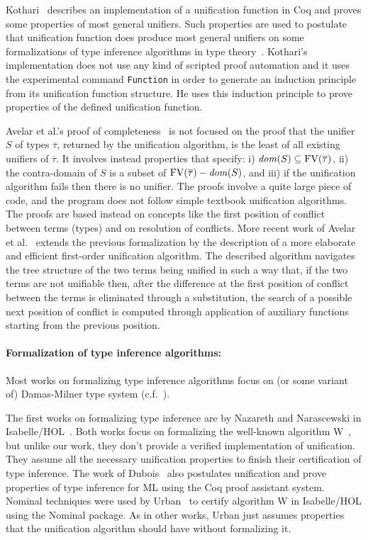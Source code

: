 Kothari~ describes an implementation of a unification
function in Coq and proves some properties of most general
unifiers. Such properties are used to postulate that unification
function does produce most general unifiers on some formalizations of
type inference algorithms in type
theory~. Kothari's implementation does not use
any kind of scripted proof automation and it uses the experimental
command \texttt{Function} in order to generate an induction principle
from its unification function structure. He uses this induction
principle to prove properties of the defined unification function.

Avelar et al.'s proof of completeness~ is not
focused on the proof that the unifier $S$ of types $\overline{\tau}$,
returned by the unification algorithm, is the least of all existing
unifiers of $\overline{\tau}$.  It involves instead properties that
specify: i) $\text{\it dom\/}(S) \subseteq \text{FV}(\overline{\tau})$, ii) the
contra-domain of $S$ is a subset of $\text{FV}(\overline{\tau}) - \text{\it dom\/}(S)$,
and iii) if the unification algorithm fails then there is no
unifier. The proofs involve a quite large piece of code, and the
program does not follow simple textbook unification algorithms. The
proofs are based instead on concepts like the first position of
conflict between terms (types) and on resolution of conflicts. More
recent work of Avelar et al.~\cite{AvelarGMA14} extends the previous
formalization by the description of a more elaborate and efficient
first-order unification algorithm. The described algorithm navigates
the tree structure of the two terms being unified in such a way that,
if the two terms are not unifiable then, after the difference at the
first position of conflict between the terms is eliminated through a
substitution, the search of a possible next position of conflict is
computed through application of auxiliary functions starting from the
previous position.

\paragraph{Formalization of type inference algorithms:} Most works on formalizing
type inference algorithms focus on (or some variant of) Damas-Milner type system
(c.f.~\cite{DuboisM99,NaraschewskiN-JAR,Nazareth-Nipkow,UrbanN2009,Garrigue10,Garrigue15}).

The first works on formalizing type inference are by Nazareth and
Narascewski in Isabelle/HOL~\cite{NaraschewskiN-JAR,Nazareth-Nipkow}.
Both works focus on formalizing the well-known algorithm
W~\cite{Milner78}, but unlike our work, they don't provide a verified
implementation of unification. They assume all the necessary
unification properties to finish their certification of type
inference. The work of Dubois~\cite{DuboisM99} also postulates
unification and prove properties of type inference for ML using the
Coq proof assistant system.  Nominal techniques were used by
Urban~\cite{UrbanN2009} to certify algorithm W in Isabelle/HOL using
the Nominal package. As in other works, Urban just assumes properties
that the unification algorithm should have without formalizing it.

